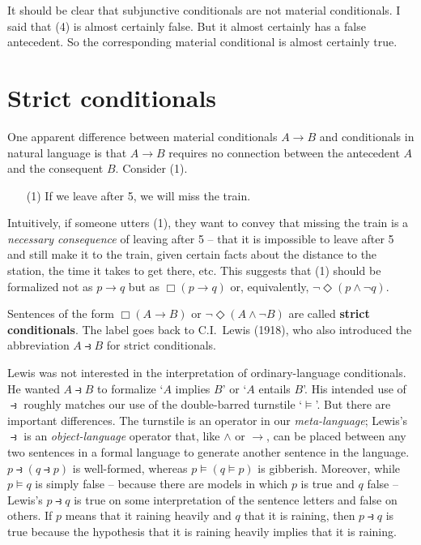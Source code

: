 It should be clear that subjunctive conditionals are not material conditionals.
I said that (4) is almost certainly false. But it almost certainly has a false
antecedent. So the corresponding material conditional is almost certainly true.

\section{Strict conditionals}\label{sec:strict-implication}


One apparent difference between material conditionals $A \to B$ and conditionals
in natural language is that $A\to B$ requires no connection between the
antecedent $A$ and the consequent $B$. Consider (1).
\begin{enumerate}[leftmargin=10mm]
  \item[(1)] If we leave after 5, we will miss the train.
\end{enumerate}
Intuitively, if someone utters (1), they want to convey that missing the train
is a \emph{necessary consequence} of leaving after 5 -- that it is impossible to
leave after 5 and still make it to the train, given certain facts about the
distance to the station, the time it takes to get there, etc. This suggests that
(1) should be formalized not as $p \to q$ but as $\Box(p \to q)$ or,
equivalently, $\neg \Diamond(p \land \neg q)$.

Sentences of the form $\Box(A \to B)$ or $\neg \Diamond(A \land \neg B)$ are
called \textbf{strict conditionals}. The label goes back to C.I.\ Lewis (1918),
who also introduced the abbreviation $A \strictif B$ for strict conditionals.

Lewis was not interested in the interpretation of ordinary-language
conditionals. He wanted $A \strictif B$ to formalize `$A$ implies $B$' or `$A$
entails $B$'. His intended use of $\strictif$ roughly matches our use of the
double-barred turnstile `$\models$'. But there are important differences. The
turnstile is an operator in our \emph{meta-language}; Lewis's $\strictif$ is an
\emph{object-language} operator that, like $\land$ or $\to$, can be placed
between any two sentences in a formal language to generate another sentence in
the language. $p \strictif (q \strictif p)$ is well-formed, whereas
$p \models (q\models p)$ is gibberish. Moreover, while $p \models q$ is simply
false -- because there are models in which $p$ is true and $q$ false -- Lewis's
$p \strictif q$ is true on some interpretation of the sentence letters and false
on others. If $p$ means that it raining heavily and $q$ that it is raining, then
$p \strictif q$ is true because the hypothesis that it is raining heavily
implies that it is raining.

